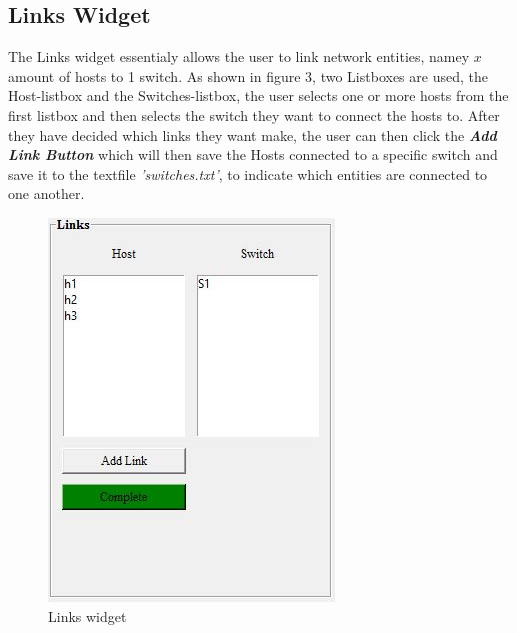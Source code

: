 \subsection{Links Widget}
The Links widget essentialy allows the user to link network entities, namey $x$ amount of hosts to 1 switch. As shown in figure 3, two Listboxes are used, the Host-listbox and the Switches-listbox, the user selects one or more hosts from the first listbox and then selects the switch they want to connect the hosts to. After they have decided which links they want make, the user can then click the \textbf{\textit{Add Link Button}} which will then save the Hosts connected to a specific switch and save it to the textfile \textit{'switches.txt'}, to indicate which entities are connected to one another.
\begin{figure}[H]
    \centering
    \includegraphics[scale=0.8]{Links}
    \caption{Links widget}
\end{figure}